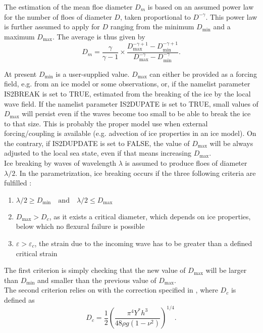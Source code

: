The estimation of the mean floe diameter $D_m$ is based on an assumed power law for the number of 
floes of diameter $D$, taken  proportional to $D^{-\gamma}$. This power law is further assumed to 
apply for $D$ ranging from 
the minimum $D_{\min}$ and a maximum $D_{\max}$. The average is thus given by  
\begin{equation}
D_m=\frac{\gamma}{\gamma -1}\times\frac{D_{\max}^{-\gamma +1}-D_{\min}^{-\gamma +1}}{D_{\max}^{-\gamma}-D_{\min}^{-\gamma}}.
\label{analytic_Dbar}
\end{equation}

\noindent
At present $D_{\min}$ is a user-supplied value. $D_{\max}$ can either be 
provided as a forcing field, e.g. from an 
ice model or some observations, or, if the namelist parameter {\code IS2BREAK} is set to {\code TRUE}, 
estimated from 
the breaking of the ice by the local wave field. If the namelist parameter {\code IS2DUPATE}  is set to  
{\code TRUE}, small values of $D_{\max}$ will persist even if the waves become too small to be able to break the ice to 
that size. This is probably the proper model 
use when  external forcing/coupling is available (e.g. advection of ice properties in an ice model). 
 On the contrary, if {\code IS2DUPDATE} is set to  {\code FALSE}, the value of $D_{\max}$ will be always adjusted to the local sea state, 
even if that means increasing $D_{\max}$.\\


Ice breaking by waves of wavelength $\lambda$ is assumed to produce floes of diameter $\lambda / 2$. 
In the parametrization, ice breaking occurs if the three following criteria are fulfilled \citep{art:Wea13}:
\begin{enumerate}
\item $\lambda/2 \geq D_{\min} \quad \mathrm{and} \quad  \lambda/2 \leq D_{\max}$
\item $D_{\max}>D_c$, as it exists a critical diameter, which depends on ice properties, below which no flexural failure is possible
\item $\varepsilon>\varepsilon_c$, the strain due to the incoming wave has to 
be greater than a defined critical strain
\end{enumerate}
The first criterion is simply checking that the new value of $D_{\max}$ will be larger than $D_{\min}$ and smaller 
than the previous value of $D_{\max}$.\\

The second criterion relies on \cite{inc:M86} with the correction specified in \cite{art:Bea18}, where $D_{c}$ is defined as
\begin{equation}
D_{c}=\dfrac{1}{2}\left(\frac{\pi^4 Y^* h^3}{48 \rho g (1 -\nu ^2)}\right)^{1/4}. 
\end{equation}

